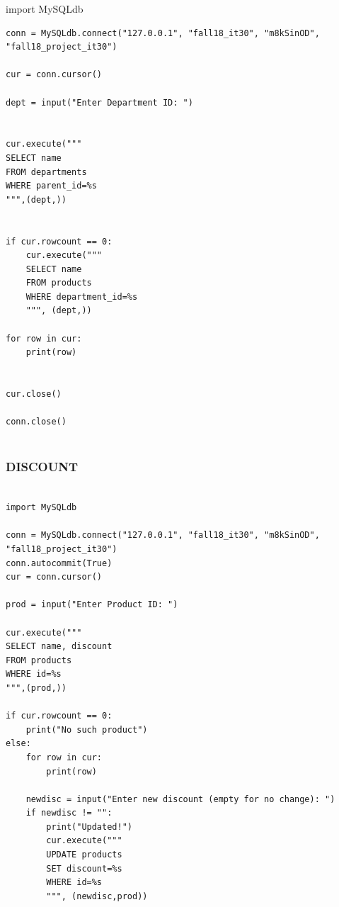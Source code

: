 \documentclass{article}
\begin{document}
import MySQLdb

\begin{verbatim}
conn = MySQLdb.connect("127.0.0.1", "fall18_it30", "m8kSinOD", "fall18_project_it30")

cur = conn.cursor()

dept = input("Enter Department ID: ")


cur.execute("""
SELECT name
FROM departments
WHERE parent_id=%s
""",(dept,))


if cur.rowcount == 0:
    cur.execute("""
    SELECT name
    FROM products
    WHERE department_id=%s
    """, (dept,))

for row in cur:
    print(row)


cur.close()

conn.close()
    
\end{verbatim}

\subsubsection*{DISCOUNT}
\begin{verbatim}

import MySQLdb

conn = MySQLdb.connect("127.0.0.1", "fall18_it30", "m8kSinOD", "fall18_project_it30")
conn.autocommit(True)
cur = conn.cursor()

prod = input("Enter Product ID: ")

cur.execute("""
SELECT name, discount
FROM products
WHERE id=%s
""",(prod,))

if cur.rowcount == 0:
    print("No such product")
else:
    for row in cur:
        print(row)

    newdisc = input("Enter new discount (empty for no change): ")
    if newdisc != "":
        print("Updated!")
        cur.execute("""
        UPDATE products
        SET discount=%s
        WHERE id=%s
        """, (newdisc,prod))

    
\end{verbatim}
\end{document}
